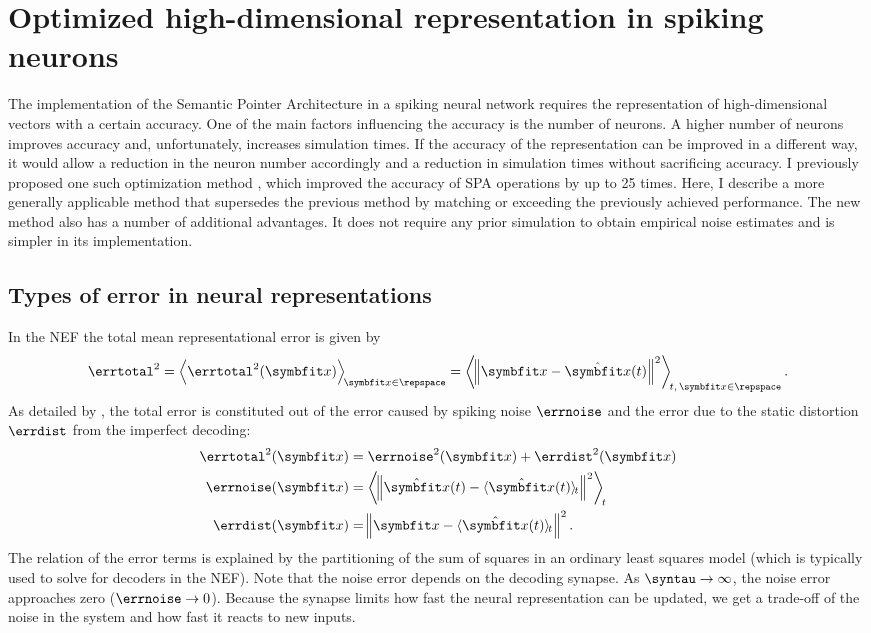 \chapter{Optimized high-dimensional representation in spiking neurons}\label{sec:hdrep}
The implementation of the Semantic Pointer Architecture in a spiking neural network requires the representation of high-dimensional vectors with a certain accuracy.
One of the main factors influencing the accuracy is the number of neurons.
A higher number of neurons improves accuracy and, unfortunately, increases simulation times.
If the accuracy of the representation can be improved in a different way, it would allow a reduction in the neuron number accordingly and a reduction in simulation times without sacrificing accuracy.
I previously proposed one such optimization method \parencite{gosmann216}, which improved the accuracy of SPA operations by up to 25 times.
Here, I describe a more generally applicable method that supersedes the previous method by matching or exceeding the previously achieved performance.
The new method also has a number of additional advantages.
It does not require any prior simulation to obtain empirical noise estimates and is simpler in its implementation.

\section{Types of error in neural representations}
In the NEF the total mean representational error is given by
\begin{equation}
    \errtotal^2 = \left\langle \errtotal^2(\vc x) \right\rangle_{\!\vc x \in \repspace} = \left\langle \norm{\vc x - \hat{\vc x}(t)}^2 \right\rangle_{\!t,\,\vc x \in \repspace} \text{.}
\end{equation}
As detailed by \textcite[47--48]{eliasmith2003}, the total error is constituted out of the error caused by spiking noise $\errnoise$ and the error due to the static distortion $\errdist$ from the imperfect decoding:
\begin{align}
    \errtotal^2(\vc x) &= \errnoise^2(\vc x) + \errdist^2(\vc x) \\
    \errnoise(\vc x) &= \left\langle \norm{\hat{\vc x}(t) - \langle \hat{\vc x}(t) \rangle_{\!t}}^2 \right\rangle_{\!t} \\
    \errdist(\vc x) &= \norm{\vc x - \langle \hat{\vc x}(t) \rangle_{\!t}}^2 \text{.}
\end{align}
The relation of the error terms is explained by the partitioning of the sum of squares in an ordinary least squares model (which is typically used to solve for decoders in the NEF).
Note that the noise error depends on the decoding synapse.
As $\syntau \rightarrow \infty$, the noise error approaches zero ($\errnoise \rightarrow 0$).
Because the synapse limits how fast the neural representation can be updated, we get a trade-off of the noise in the system and how fast it reacts to new inputs.

